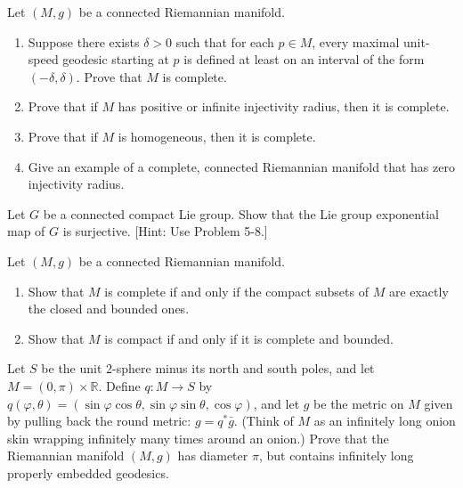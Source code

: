 \begin{exercise}
\label{prob:geodesic-completeness}

Let $(M, g)$ be a connected Riemannian manifold.
\begin{enumerate}
\item[(a)] Suppose there exists $\delta > 0$ such that for each $p \in M$, every maximal unit-speed geodesic starting at $p$ is defined at least on an interval of the form $(-\delta, \delta)$. Prove that $M$ is complete.
\item[(b)] Prove that if $M$ has positive or infinite injectivity radius, then it is complete.
\item[(c)] Prove that if $M$ is homogeneous, then it is complete.
\item[(d)] Give an example of a complete, connected Riemannian manifold that has zero injectivity radius.
\end{enumerate}
\end{exercise}

\begin{exercise}
\label{prob:lie-group-exp-surjective}

Let $G$ be a connected compact Lie group. Show that the Lie group exponential map of $G$ is surjective. [Hint: Use Problem 5-8.]
\end{exercise}

\begin{exercise}
\label{prob:compact-complete-characterization}

Let $(M, g)$ be a connected Riemannian manifold.
\begin{enumerate}
\item[(a)] Show that $M$ is complete if and only if the compact subsets of $M$ are exactly the closed and bounded ones.
\item[(b)] Show that $M$ is compact if and only if it is complete and bounded.
\end{enumerate}
\end{exercise}

\begin{exercise}
\label{prob:onion-skin-geodesics}

Let $S$ be the unit 2-sphere minus its north and south poles, and let $M = (0, \pi) \times \mathbb{R}$. Define $q : M \to S$ by $q(\varphi, \theta) = (\sin \varphi \cos \theta, \sin \varphi \sin \theta, \cos \varphi)$, and let $g$ be the metric on $M$ given by pulling back the round metric: $g = q^* \bar{g}$. (Think of $M$ as an infinitely long onion skin wrapping infinitely many times around an onion.) Prove that the Riemannian manifold $(M, g)$ has diameter $\pi$, but contains infinitely long properly embedded geodesics.
\end{exercise}


